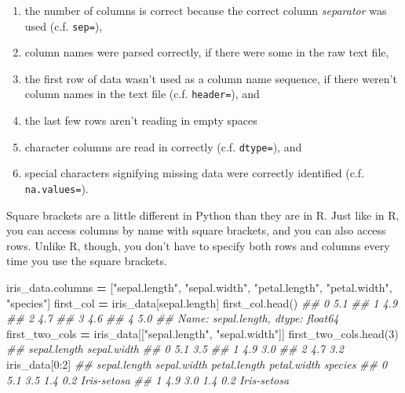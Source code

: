 \documentclass[
  12pt,
]{krantz}
\makeatletter
\newenvironment{Shaded}{\begin{snugshade}}{\end{snugshade}}
\newcommand{\CommentTok}[1]{\textcolor[rgb]{0.37,0.37,0.37}{\textit{#1}}}
\newcommand{\DecValTok}[1]{\textcolor[rgb]{0.06,0.06,0.06}{#1}}
\newcommand{\NormalTok}[1]{#1}
\newcommand{\OperatorTok}[1]{\textcolor[rgb]{0.43,0.43,0.43}{\textbf{#1}}}
\newcommand{\StringTok}[1]{\textcolor[rgb]{0.5,0.5,0.5}{#1}}
\providecommand{\tightlist}{%
  \setlength{\itemsep}{0pt}\setlength{\parskip}{0pt}}
\newenvironment{kframe}{%
\medskip{}
\setlength{\fboxsep}{.8em}
 \def\at@end@of@kframe{}%
 \ifinner\ifhmode%
  \def\at@end@of@kframe{\end{minipage}}%
  \begin{minipage}{\columnwidth}%
 \fi\fi%
 \def\FrameCommand##1{\hskip\@totalleftmargin \hskip-\fboxsep
 \colorbox{shadecolor}{##1}\hskip-\fboxsep
     \hskip-\linewidth \hskip-\@totalleftmargin \hskip\columnwidth}%
 \MakeFramed {\advance\hsize-\width
   \@totalleftmargin\z@ \linewidth\hsize
   \@setminipage}}%
 {\par\unskip\endMakeFramed%
 \at@end@of@kframe}
\renewenvironment{Shaded}{\begin{kframe}}{\end{kframe}}
\makeatother
\begin{document}
\begin{enumerate}
\def\labelenumi{\arabic{enumi}.}
\tightlist
\item
  the number of columns is correct because the correct column \emph{separator} was used (c.f. \texttt{sep=}),
\item
  column names were parsed correctly, if there were some in the raw text file,
\item
  the first row of data wasn't used as a column name sequence, if there weren't column names in the text file (c.f. \texttt{header=}), and
\item
  the last few rows aren't reading in empty spaces
\item
  character columns are read in correctly (c.f. \texttt{dtype=}), and
\item
  special characters signifying missing data were correctly identified (c.f. \texttt{na.values=}).
\end{enumerate}

Square brackets are a little different in Python than they are in R. Just like in R, you can access columns by name with square brackets, and you can also access rows. Unlike R, though, you don't have to specify both rows and columns every time you use the square brackets.

\begin{Shaded}
\begin{Highlighting}[]
\NormalTok{iris\_data.columns }\OperatorTok{=}\NormalTok{ [}\StringTok{"sepal.length"}\NormalTok{, }\StringTok{"sepal.width"}\NormalTok{, }
                     \StringTok{"petal.length"}\NormalTok{, }\StringTok{"petal.width"}\NormalTok{, }
                     \StringTok{"species"}\NormalTok{]}
\NormalTok{first\_col }\OperatorTok{=}\NormalTok{ iris\_data[}\StringTok{\textquotesingle{}sepal.length\textquotesingle{}}\NormalTok{]}
\NormalTok{first\_col.head()}
\CommentTok{\#\# 0    5.1}
\CommentTok{\#\# 1    4.9}
\CommentTok{\#\# 2    4.7}
\CommentTok{\#\# 3    4.6}
\CommentTok{\#\# 4    5.0}
\CommentTok{\#\# Name: sepal.length, dtype: float64}
\NormalTok{first\_two\_cols }\OperatorTok{=}\NormalTok{ iris\_data[[}\StringTok{"sepal.length"}\NormalTok{, }\StringTok{"sepal.width"}\NormalTok{]]}
\NormalTok{first\_two\_cols.head(}\DecValTok{3}\NormalTok{)}
\CommentTok{\#\#    sepal.length  sepal.width}
\CommentTok{\#\# 0           5.1          3.5}
\CommentTok{\#\# 1           4.9          3.0}
\CommentTok{\#\# 2           4.7          3.2}
\NormalTok{iris\_data[}\DecValTok{0}\NormalTok{:}\DecValTok{2}\NormalTok{]}
\CommentTok{\#\#    sepal.length  sepal.width  petal.length  petal.width      species}
\CommentTok{\#\# 0           5.1          3.5           1.4          0.2  Iris{-}setosa}
\CommentTok{\#\# 1           4.9          3.0           1.4          0.2  Iris{-}setosa}
\end{Highlighting}
\end{Shaded}
\end{document}
